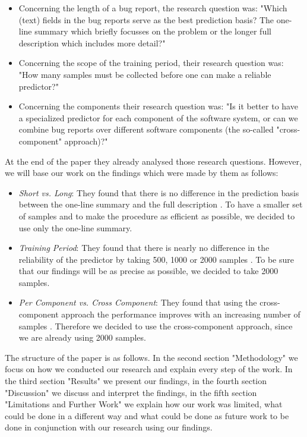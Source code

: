 \documentclass[sigconf,screen]{acmart}
\begin{document}
\begin{itemize}
	\item Concerning the length of a bug report, the research question was: "Which (text) fields in the bug reports serve as the best prediction basis? The one-line summary which briefly focusses on the problem or the longer full description which includes more detail?" \cite{ourPaper}
	
	\item Concerning the scope of the training period, their research question was: "How many samples must be collected before one can make a reliable predictor?" \cite{ourPaper}
	
	\item Concerning the components their research question was: "Is it better to have a specialized predictor for each component of the software system, or can we combine bug reports over different software components (the so-called "cross- component" approach)?" \cite{ourPaper}
\end{itemize}

At the end of the paper they already analysed those research questions. However, we will base our work on the findings which were made by them as follows:

\begin{itemize}
	\item \textit{Short vs. Long}: They found that there is no difference in the prediction basis between the one-line summary and the full description \cite{ourPaper}. To have a smaller set of samples and to make the procedure as efficient as possible, we decided to use only the one-line summary.
	
	\item \textit{Training Period}: They found that there is nearly no difference in the reliability of the predictor by taking 500, 1000 or 2000 samples \cite{ourPaper}. To be sure that our findings will be as precise as possible, we decided to take 2000 samples.
	
	\item \textit{Per Component vs. Cross Component}: They found that using the cross-component approach the performance improves with an increasing number of samples \cite{ourPaper}. Therefore we decided to use the cross-component approach, since we are already using 2000 samples.
\end{itemize}

The structure of the paper is as follows. In the second section "Methodology" we focus on how we conducted our research and explain every step of the work. In the third section "Results" we present our findings, in the fourth section "Discussion" we discuss and interpret the findings, in the fifth section "Limitations and Further Work" we explain how our work was limited, what could be done in a different way and what could be done as future work to be done in conjunction with our research using our findings.
\end{document}
